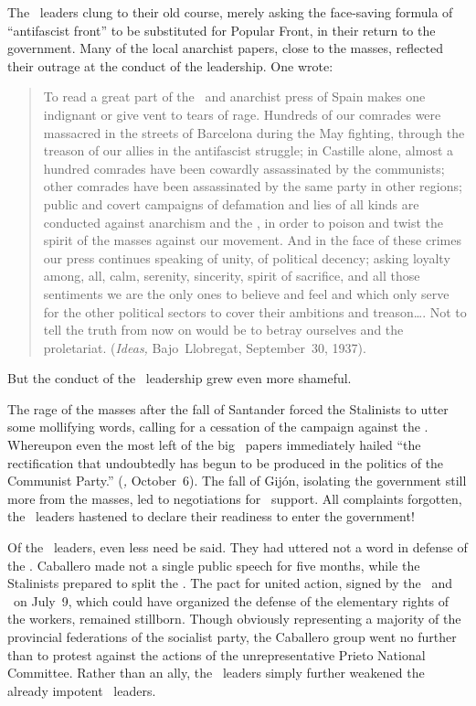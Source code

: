 The \CNT\ leaders clung to their old course, merely asking the face-saving formula of ``antifascist front'' to be substituted for Popular Front, in their return to the government. Many of the local anarchist papers, close to the masses, reflected their outrage at the conduct of the leadership. One wrote:

\begin{quotation}
  To read a great part of the \CNT\ and anarchist press of Spain makes one indignant or give vent to tears of rage. Hundreds of our comrades were massacred in the streets of Barcelona during the May fighting, through the treason of our allies in the antifascist struggle; in Castille alone, almost a hundred comrades have been cowardly assassinated by the communists; other comrades have been assassinated by the same party in other regions; public and covert campaigns of de\-fam\-a\-tion and lies of all kinds are conducted against anarchism and the \CNT\kn, in order to poison and twist the spirit of the masses against our movement. And in the face of these crimes our press continues speaking of unity\kn, of political decency; asking loyalty among, all, calm, serenity\kn, sincerity\kn, spirit of sacrifice, and all those sentiments we are the only ones to believe and feel and which only serve for the other political sectors to cover their ambitions and treason\dots. Not to tell the truth from now on would be to betray ourselves and the proletariat. (\emph{Ideas,} Bajo~Llo\-bre\-gat, September~30, 1937).
\end{quotation}

\noindent
But the conduct of the \CNT\ leadership grew even more shameful.

The rage of the masses after the fall of Santander forced the Stalinists to utter some mollifying words, calling for a cessation of the campaign against the \CNT\kn. Whereupon even the most left of the big \CNT\ papers immediately hailed ``the rectification that undoubtedly has begun to be produced in the politics of the Communist Party.'' (\emph{\CNT,} October~6). The fall of Gij\'on, isolating the government still more from the masses, led to negotiations for \CNT\ support. All complaints forgotten, the \CNT\ leaders hastened to declare their readiness to enter the government!

Of the \UGT\ leaders, even less need be said. They had uttered not a word in defense of the \POUM\kn. Caballero made not a single public speech for five months, while the Stalinists prepared to split the \UGT\kn. The pact for united action, signed by the \CNT\ and \UGT\ on July~9, which could have organized the defense of the elementary rights of the workers\kn, remained stillborn. Though obviously representing a majority of the provincial federations of the socialist party\kn, the Caballero group went no further than to protest against the actions of the unrepresentative Prieto National Committee. Rather than an ally, the \UGT\ leaders simply further weakened the already impotent \CNT\ leaders.

